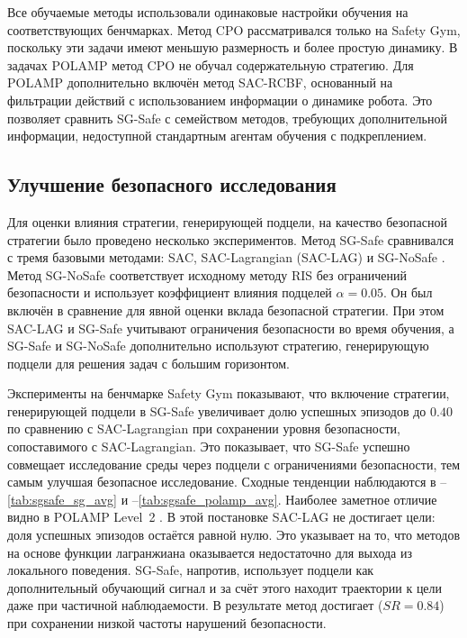 Все обучаемые методы использовали одинаковые настройки обучения на соответствующих бенчмарках. Метод CPO рассматривался только на Safety Gym, поскольку эти задачи имеют меньшую размерность и более простую динамику. В задачах POLAMP метод CPO не обучал содержательную стратегию. Для POLAMP дополнительно включён метод SAC-RCBF, основанный на фильтрации действий с использованием информации о динамике робота. Это позволяет сравнить SG-Safe с семейством методов, требующих дополнительной информации, недоступной стандартным агентам обучения с подкреплением.

\subsection{Улучшение безопасного исследования}
\label{subsec:sgsafe_rq1}

Для оценки влияния стратегии, генерирующей подцели, на качество безопасной стратегии было проведено несколько экспериментов. Метод SG-Safe сравнивался с тремя базовыми методами: SAC, SAC-Lagrangian (SAC-LAG) и SG-NoSafe . Метод SG-NoSafe соответствует исходному методу RIS без ограничений безопасности и использует коэффициент влияния подцелей $\alpha = 0.05$. Он был включён в сравнение для явной оценки вклада безопасной стратегии. При этом SAC-LAG и SG-Safe учитывают ограничения безопасности во время обучения, а SG-Safe и SG-NoSafe дополнительно используют стратегию, генерирующую подцели для решения задач с большим горизонтом.

Эксперименты на бенчмарке Safety Gym  показывают, что включение стратегии, генерирующей подцели в SG-Safe увеличивает долю успешных эпизодов до $0.40$ по сравнению с SAC-Lagrangian при сохранении уровня безопасности, сопоставимого с SAC-Lagrangian. Это показывает, что SG-Safe успешно совмещает исследование среды через подцели с ограничениями безопасности, тем самым улучшая безопасное исследование. Сходные тенденции наблюдаются в --\ref{tab:sgsafe_sg_avg} и --\ref{tab:sgsafe_polamp_avg}. Наиболее заметное отличие видно в POLAMP Level~2 . В этой постановке SAC-LAG не достигает цели: доля успешных эпизодов остаётся равной нулю. Это указывает на то, что методов на основе функции лагранжиана оказывается недостаточно для выхода из локального поведения. SG-Safe, напротив, использует подцели как дополнительный обучающий сигнал и за счёт этого находит траектории к цели даже при частичной наблюдаемости. В результате метод достигает ($SR = 0.84$) при сохранении низкой частоты нарушений безопасности.

